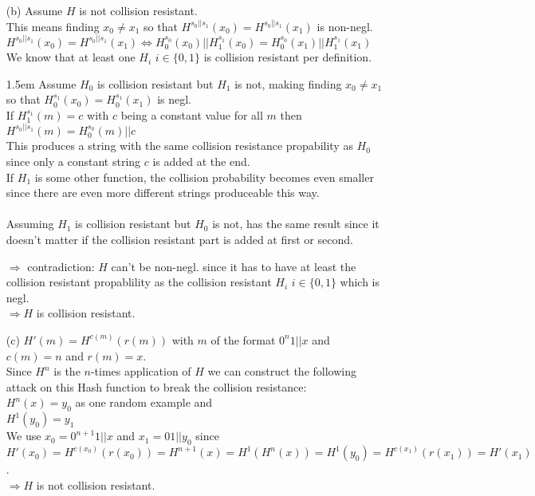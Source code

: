 \begin{itemize}
\item[(b)]
	Assume \(H\) is not collision resistant. \\
	This means finding \(x_0 \neq x_1\) so that \(H^{s_0 \vert\vert s_1}(x_0) = H^{s_0 \vert\vert s_1}(x_1)\) is non-negl. \\
	\(H^{s_0 \vert\vert s_1}(x_0) = H^{s_0 \vert\vert s_1}(x_1) \Leftrightarrow H^{s_0}_0(x_0) \vert\vert H^{s_1}_1(x_0) = H^{s_0}_0(x_1) \vert\vert H^{s_1}_1(x_1) \) \\
	We know that at least one \(H_i\) \(i \in \{0,1\}\) is collision resistant per definition. \\
	\par
	\begingroup
	\leftskip1.5em
	\rightskip\leftskip
		Assume \(H_0\) is collision resistant but \(H_1\) is not, making finding \(x_0 \neq x_1\) so that \(H^{s_1}_0(x_0) = H^{s_1}_0(x_1)\) is negl. \\
		If \(H^{s_1}_1(m) = c\) with \(c\) being a constant value for all \(m\) then \(H^{s_0 \vert\vert s_1}(m) = H^{s_0}_0(m) \vert\vert c\)\\
		This produces a string with the same collision resistance propability as \(H_0\) since only a constant string \(c\) is added at the end.\\
		If \(H_1\) is some other function, the collision probability becomes even smaller since there are even more different strings produceable this way.\\ 
		\\
		Assuming \(H_1\) is collision resistant but \(H_0\) is not, has the same result since it doesn't matter if the collision resistant part is added at first or 				second. \\
	\par
	\endgroup
	\(\Rightarrow\) contradiction: \(H\) can't be non-negl. since it has to have at least the collision resistant propablility as the collision resistant  \(H_i\) \(i \in \{0,1\}\) which is negl. \\
	\(\Rightarrow H\) is collision resistant.\\

\item[(c)] 
	\(H'(m) = H^{c(m)}(r(m))\) with \(m\) of the format \(0^n1\vert\vert x\) and \(c(m) = n\) and \(r(m) = x\). \\
	Since \(H^n\) is the \(n\)-times application of \(H\) we can construct the following attack on this Hash function to break the collision resistance: \\
	\(H^{n}(x) = y_0\) as one random example and \\ 
	\(H^1(y_0) = y_1\) \\
	We use \(x_0 = 0^{n + 1}1 \vert\vert x\) and \(x_1 = 01 \vert\vert y_0\) since\\
	\(H'(x_0) = H^{c(x_0)}(r(x_0)) = H^{n+1}(x) = H^1(H^n (x)) = H^1(y_0) = H^{c(x_1)}(r(x_1)) = H'(x_1)\). \\
	\(\Rightarrow H\) is not collision resistant.\\
	
\end{itemize}  
  